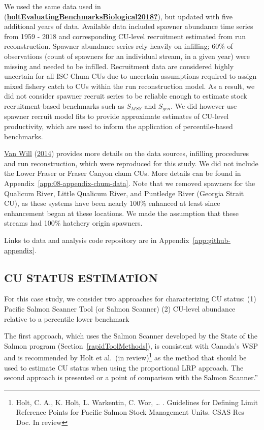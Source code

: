 \documentclass[11pt]{book}
\begin{document}
We used the same data used in (\protect\hyperlink{ref-holtEvaluatingBenchmarksBiological2018}{\textbf{holtEvaluatingBenchmarksBiological2018?}}), but updated with five additional years of data. Available data included spawner abundance time series from 1959 - 2018 and corresponding CU-level recruitment estimated from run reconstruction. Spawner abundance series rely heavily on infilling; 60\% of observations (count of spawners for an individual stream, in a given year) were missing and needed to be infilled. Recruitment data are considered highly uncertain for all ISC Chum CUs due to uncertain assumptions required to assign mixed fishery catch to CUs within the run reconstruction model. As a result, we did not consider spawner recruit series to be reliable enough to estimate stock recruitment-based benchmarks such as \(S_{MSY}\) and \(S_{gen}\). We did however use spawner recruit model fits to provide approximate estimates of CU-level productivity, which are used to inform the application of percentile-based benchmarks.

\protect\hyperlink{ref-vanwillInnerSouthCoast2014}{Van Will} (\protect\hyperlink{ref-vanwillInnerSouthCoast2014}{2014}) provides more details on the data sources, infilling procedures and run reconstruction, which were reproduced for this study. We did not include the Lower Fraser or Fraser Canyon chum CUs. More details can be found in Appendix~\ref{app:08-appendix-chum-data}. Note that we removed spawners for the Qualicum River, Little Qualicum River, and Puntledge River (Georgia Strait CU), as these systems have been nearly 100\% enhanced at least since enhancement began at these locations. We made the assumption that these streams had 100\% hatchery origin spawners.

Links to data and analysis code repository are in Appendix~\ref{app:github-appendix}.

\hypertarget{cu-status-estimation-1}{%
\subsection{CU STATUS ESTIMATION}\label{cu-status-estimation-1}}

For this case study, we consider two approaches for characterizing CU status: (1) Pacific Salmon Scanner Tool (or Salmon Scanner) (2) CU-level abundance relative to a percentile lower benchmark

The first approach, which uses the Salmon Scanner developed by the State of the Salmon program (Section~\ref{rapidToolMethods}), is consistent with Canada's WSP and is recommended by Holt et al.~(in review)\footnote{Holt, C. A., K. Holt, L. Warkentin, C. Wor, \ldots{} . Guidelines for Defining Limit Reference Points for Pacific Salmon Stock Management Units. CSAS Res Doc. In review} as the method that should be used to estimate CU status when using the proportional LRP approach. The second approach is presented or a point of comparison with the Salmon Scanner.''
\end{document}
